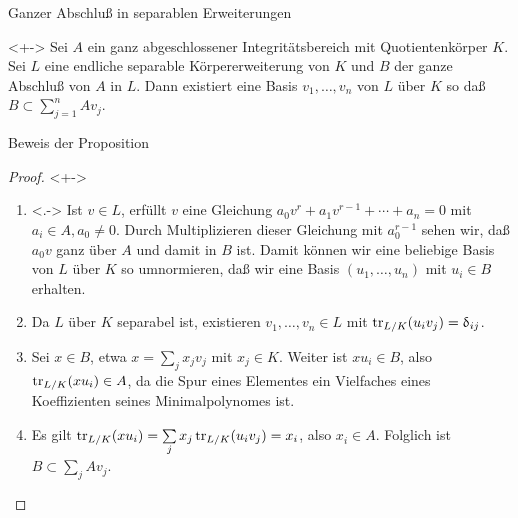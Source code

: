 \begin{frame}{Ganzer Abschluß in separablen Erweiterungen}
	\begin{proposition}<+->
		Sei \(A\) ein ganz abgeschlossener Integritätsbereich mit Quotientenkörper
		\(K\). Sei \(L\) eine endliche separable Körpererweiterung von \(K\) und
		\(B\) der ganze Abschluß von \(A\) in \(L\). Dann existiert eine
		Basis \(v_1, \dotsc, v_n\) von \(L\) über \(K\) so daß
		\(B \subset \sum\limits_{j = 1}^n A v_j\).
	\end{proposition}
\end{frame}

\begin{frame}{Beweis der Proposition}
	\begin{proof}<+->
		\begin{enumerate}[<+->]
		\item<.->
			Ist \(v \in L\), erfüllt \(v\) eine Gleichung
			\(a_0 v^r + a_1 v^{r - 1} + \dotsb + a_n = 0\) mit \(a_i \in A, a_0
			\neq 0\).
			Durch Multiplizieren dieser Gleichung mit \(a_0^{r - 1}\) sehen wir,
			daß \(a_0 v\) ganz über \(A\) und damit in \(B\) ist. Damit können
			wir eine beliebige Basis von \(L\) über \(K\) so umnormieren,
			daß wir eine Basis \((u_1, \dotsc, u_n)\) mit \(u_i \in B\) erhalten.
		\item
			Da \(L\) über \(K\) separabel ist, existieren \(v_1, \dotsc, v_n
			\in L\) mit \(\operatorname{tr}_{L/K}(u_i v_j) = \updelta_{ij}\).
		\item
			Sei \(x \in B\), etwa \(x = \sum\limits_j x_j v_j\) mit \(x_j \in K\).
			Weiter ist \(x u_i \in B\), also \(\operatorname{tr}_{L/K} (x u_i) \in A\), da die
			Spur eines Elementes ein Vielfaches eines Koeffizienten seines
			Minimalpolynomes ist.
		\item
			Es gilt \(\operatorname{tr}_{L/K} (x u_i) = \sum\limits_j x_j \operatorname{tr}_{L/K}(u_i v_j)
			= x_i\), also \(x_i \in A\). Folglich ist \(B \subset \sum\limits_j
			A v_j\).
			\qedhere
		\end{enumerate}
	\end{proof}
\end{frame}

